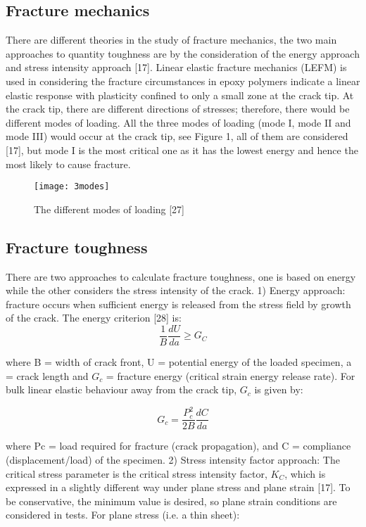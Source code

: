 \documentclass[numbers=noendperiod,chapterprefix=on]{icldt} %
\begin{document}
\subsection{Fracture mechanics}
There are different theories in the study of fracture mechanics, the two main approaches to quantity toughness are by the consideration of the energy approach and stress intensity approach [17]. Linear elastic fracture mechanics (LEFM) is used in considering the fracture circumstances in epoxy polymers indicate a linear elastic response with plasticity confined to only a small zone at the crack tip.
At the crack tip, there are different directions of stresses; therefore, there would be different modes of loading. All the three modes of loading (mode I, mode II and mode III) would occur at the crack tip, see Figure 1, all of them are considered [17], but mode I is the most critical one as it has the lowest energy and hence the most likely to cause fracture. 
\begin{figure}[!htpb]
\centering
\texttt{[image: 3modes]}
\caption{The different modes of loading [27]}
\end{figure}

\subsection{Fracture toughness}
There are two approaches to calculate fracture toughness, one is based on energy while the other considers the stress intensity of the crack.
1) Energy approach: fracture occurs when sufficient energy is released from the stress field by growth of the crack. The energy criterion [28] is:
\begin{equation} \label{Energy criterion [28]}
\frac{1}{B} \frac{dU}{da} \geq G_C 
\end{equation}

where B = width of crack front, U = potential energy of the loaded specimen, a = crack length and $G_c$ = fracture energy (critical strain energy release rate). 
For bulk linear elastic behaviour away from the crack tip, $G_c$ is given by:

\begin{equation} \label{fracture energy [28]}
G_c=\frac{P^2_c}{2B} \frac{dC}{da}
\end{equation}

where Pc = load required for fracture (crack propagation), and C = compliance (displacement/load) of the specimen.
2) Stress intensity factor approach: The critical stress parameter is the critical stress intensity factor, $K_C$, which is expressed in a slightly different way under plane stress and plane strain [17]. To be conservative, the minimum value is desired, so plane strain conditions are considered in tests. 
For plane stress (i.e. a thin sheet): 
\end{document}

